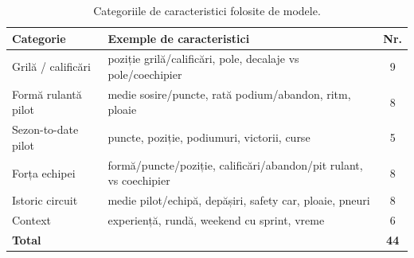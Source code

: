 \documentclass[12pt,a4paper]{report}
\begin{document}
\begin{table}[htbp]
  \centering
  \begin{tabular}{l l c}
    \toprule
    \textbf{Categorie} & \textbf{Exemple de caracteristici} & \textbf{Nr.} \\
    \midrule
    Grilă / calificări     & poziție grilă/calificări, pole, decalaje vs pole/coechipier & 9  \\
    Formă rulantă pilot    & medie sosire/puncte, rată podium/abandon, ritm, ploaie  & 8  \\
    Sezon-to-date pilot    & puncte, poziție, podiumuri, victorii, curse             & 5  \\
    Forța echipei          & formă/puncte/poziție, calificări/abandon/pit rulant, vs coechipier & 8  \\
    Istoric circuit        & medie pilot/echipă, depășiri, safety car, ploaie, pneuri & 8  \\
    Context                & experiență, rundă, weekend cu sprint, vreme             & 6  \\
    \midrule
    \textbf{Total}         &                                                         & \textbf{44} \\
    \bottomrule
  \end{tabular}
  \caption{Categoriile de caracteristici folosite de modele.}
  \label{tab:features}
\end{table}
\end{document}
